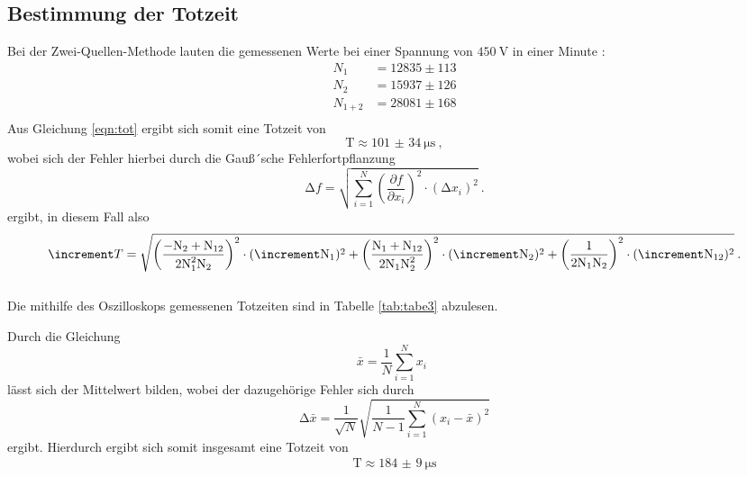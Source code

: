 \subsection{Bestimmung der Totzeit}

Bei der Zwei-Quellen-Methode lauten die gemessenen Werte bei einer Spannung von
$\SI{450}{\volt}$ in einer Minute :
\begin{align*}
  N_1 &= 12835 \pm 113 \\
  N_2 &= 15937 \pm 126 \\
  N_{1+2} &= 28081 \pm 168 \\
\end{align*}
Aus Gleichung \ref{eqn:tot} ergibt sich somit eine Totzeit von
\begin{equation*}
  \text{T} \approx \SI{101(34)}{\micro\second} \: ,
\end{equation*}
wobei sich der Fehler hierbei durch die Gauß´sche Fehlerfortpflanzung
\begin{equation}
  \increment f = \sqrt{ \sum_{i=1}^N \left( \frac{\partial f}{\partial x_i}\right)^2
  \cdot (\increment x_i)^2  } \: .
  \label{eqn:gaus}
\end{equation}
ergibt, in diesem Fall also
\begin{equation}
  \increment T = \sqrt{\left( \frac{-\text{N}_{2}+\text{N}_{12}}{2\text{N}_{1}^2\text{N}_{2}} \right)^2 \cdot (\increment \text{N}_{1})^2 \\
   + \left( \frac{\text{N}_{1}+\text{N}_{12}}{2\text{N}_{1}\text{N}_{2}^2} \right)^2 \cdot (\increment \text{N}_{2})^2
  +\left( \frac{1}{2\text{N}_{1}\text{N}_{2}} \right)^2 \cdot (\increment \text{N}_{12})^2 } \: .
\end{equation}
 \\
Die mithilfe des Oszilloskops gemessenen Totzeiten sind in Tabelle \ref{tab:tabe3}
abzulesen.

Durch die Gleichung
\begin{equation}
  \bar{x} = \frac{1}{N} \sum_{i=1}^{N} x_i \: \:
  \label{eqn:mit}
\end{equation}
\noindent lässt sich der Mittelwert bilden, wobei der dazugehörige Fehler sich durch
\begin{equation}
  \increment \bar{x} = \frac{1}{\sqrt{N}} \sqrt{ \frac{1}{N-1} \sum_{i=1}^N
  (x_i - \bar{x})^2}
  \label{eqn:mitf}
\end{equation}
ergibt. Hierdurch ergibt sich somit insgesamt eine Totzeit von
\begin{align*}
  \text{T} \approx \SI{184(9)}{\micro\second}
\end{align*}
